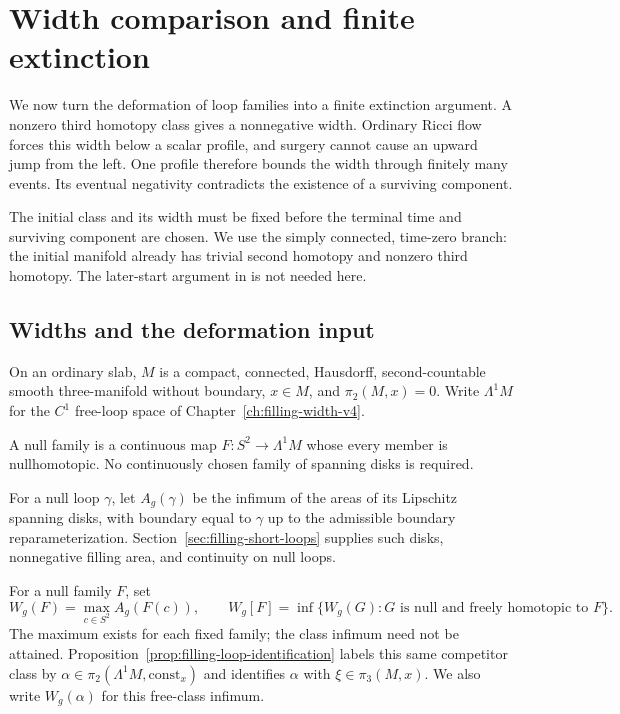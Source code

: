 \chapter{Width comparison and finite extinction}
\label{ch:extinction-v4}

We now turn the deformation of loop families into a finite extinction
argument. A nonzero third homotopy class gives a nonnegative width.
Ordinary Ricci flow forces this width below a scalar profile, and surgery
cannot cause an upward jump from the left. One profile therefore bounds
the width through finitely many events. Its eventual negativity contradicts
the existence of a surviving component.

The initial class and its width must be fixed before the terminal time and
surviving component are chosen. We use the simply connected, time-zero
branch: the initial manifold already has trivial second homotopy and
nonzero third homotopy. The later-start argument in
\cite[Section 18.3.2, pp. 431--432]{MT2007} is not needed here.

\section{Widths and the deformation input}

On an ordinary slab, $M$ is a compact, connected, Hausdorff, second-countable
smooth three-manifold without boundary, $x\in M$, and $\pi_2(M,x)=0$.
Write $\Lambda^1M$ for the $C^1$ free-loop space of
Chapter~\ref{ch:filling-width-v4}.

\begin{definition}
\label{def:v4-null-family}
A null family is a continuous map $F:S^2\to\Lambda^1M$ whose every member
is nullhomotopic. No continuously chosen family of spanning disks is required.
\end{definition}

For a null loop $\gamma$, let $A_g(\gamma)$ be the infimum of the areas of
its Lipschitz spanning disks, with boundary equal to $\gamma$ up to the
admissible boundary reparameterization. Section~\ref{sec:filling-short-loops}
supplies such disks, nonnegative filling area, and continuity on null loops.

\begin{definition}
\label{def:v4-family-width}
\label{def:v4-free-width}
For a null family $F$, set
\[
 W_g(F)=\max_{c\in S^2}A_g(F(c)),\qquad
 W_g[F]=\inf\{W_g(G):G\text{ is null and freely homotopic to }F\}.
\]
The maximum exists for each fixed family; the class infimum need not be
attained. Proposition~\ref{prop:filling-loop-identification} labels this
same competitor class by $\alpha\in\pi_2(\Lambda^1M,\mathrm{const}_x)$
and identifies $\alpha$ with $\xi\in\pi_3(M,x)$. We also write
$W_g(\alpha)$ for this free-class infimum.
\end{definition}

